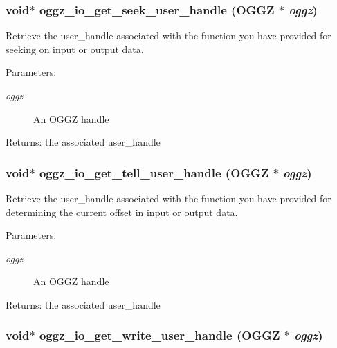 \subsubsection{\setlength{\rightskip}{0pt plus 5cm}void$\ast$ oggz\_\-io\_\-get\_\-seek\_\-user\_\-handle ({\bf OGGZ} $\ast$ {\em oggz})}\label{oggz__io_8h_a10}


Retrieve the user\_\-handle associated with the function you have provided for seeking on input or output data. 

\begin{Desc}
\item[Parameters:]
\begin{description}
\item[{\em oggz}]An OGGZ handle \end{description}
\end{Desc}
\begin{Desc}
\item[Returns:]the associated user\_\-handle \end{Desc}
\subsubsection{\setlength{\rightskip}{0pt plus 5cm}void$\ast$ oggz\_\-io\_\-get\_\-tell\_\-user\_\-handle ({\bf OGGZ} $\ast$ {\em oggz})}\label{oggz__io_8h_a12}


Retrieve the user\_\-handle associated with the function you have provided for determining the current offset in input or output data. 

\begin{Desc}
\item[Parameters:]
\begin{description}
\item[{\em oggz}]An OGGZ handle \end{description}
\end{Desc}
\begin{Desc}
\item[Returns:]the associated user\_\-handle \end{Desc}
\subsubsection{\setlength{\rightskip}{0pt plus 5cm}void$\ast$ oggz\_\-io\_\-get\_\-write\_\-user\_\-handle ({\bf OGGZ} $\ast$ {\em oggz})}\label{oggz__io_8h_a8}


